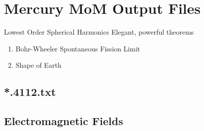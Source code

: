 % 

\section{Mercury MoM Output Files}
\begin{frame}{Lowest Order Spherical Harmonics}
Elegant, powerful theorems
\begin{enumerate}
	\item Bohr-Wheeler Spontaneous Fission Limit
	\item Shape of Earth
\end{enumerate}
\end{frame}

\subsection{*.4112.txt}

\subsection{Electromagnetic Fields}

\endinput  %

